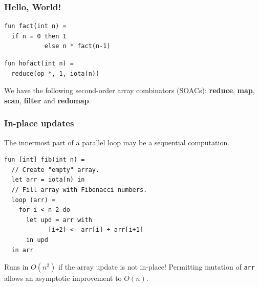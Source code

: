 \documentclass{beamer}
\newcommand{\LO}{$\mathcal{L}_0$}
\begin{document}

\begin{frame}[fragile]
  \frametitle{Hello, World!}

\begin{lstlisting}
fun fact(int n) =
  if n = 0 then 1
           else n * fact(n-1)
\end{lstlisting}

\begin{lstlisting}
fun hofact(int n) =
  reduce(op *, 1, iota(n))
\end{lstlisting}

  We have the following second-order array combinators (SOACs):
  \textbf{reduce}, \textbf{map}, \textbf{scan}, \textbf{filter} and
  \textbf{redomap}.

\end{frame}

\begin{frame}[fragile]
  \frametitle{In-place updates}

  The innermost part of a parallel loop may be a sequential
  computation.

\begin{lstlisting}
fun [int] fib(int n) =
  // Create "empty" array.
  let arr = iota(n) in
  // Fill array with Fibonacci numbers.
  loop (arr) =
    for i < n-2 do
      let upd = arr with
            [i+2] <- arr[i] + arr[i+1]
      in upd
  in arr
\end{lstlisting}

  Runs in $O(n^{2})$ if the array update is not in-place!  Permitting
  mutation of \texttt{arr} allows an asymptotic improvement to $O(n)$.

\end{frame}
\end{document}
